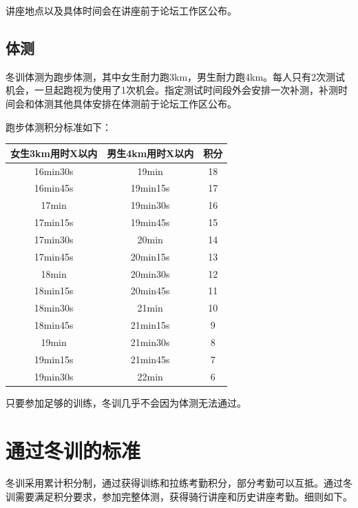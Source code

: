 \documentclass[UTF8]{ctexart}
\begin{document}
讲座地点以及具体时间会在讲座前于论坛工作区公布。

\subsection{体测}

冬训体测为跑步体测，其中女生耐力跑3km，男生耐力跑4km。每人只有2次测试机会，一旦起跑视为使用了1次机会。指定测试时间段外会安排一次补测，补测时间会和体测其他具体安排在体测前于论坛工作区公布。

跑步体测积分标准如下：

\begin{table}[h]
    \centering
    \begin{tabular}{|c|c|c|}
    \hline
    女生3km用时X以内 & 男生4km用时X以内 & 积分 \\ \hline
    16min30s   & 19min      & 18 \\ \hline
    16min45s   & 19min15s   & 17 \\ \hline
    17min      & 19min30s   & 16 \\ \hline
    17min15s   & 19min45s   & 15 \\ \hline
    17min30s   & 20min      & 14 \\ \hline
    17min45s   & 20min15s   & 13 \\ \hline
    18min      & 20min30s   & 12 \\ \hline
    18min15s   & 20min45s   & 11 \\ \hline
    18min30s   & 21min      & 10 \\ \hline
    18min45s   & 21min15s   & 9  \\ \hline
    19min      & 21min30s   & 8  \\ \hline
    19min15s   & 21min45s   & 7  \\ \hline
    19min30s   & 22min      & 6  \\ \hline
    \end{tabular}\label{test}
    \end{table}

只要参加足够的训练，冬训几乎不会因为体测无法通过。 

\section{通过冬训的标准}

冬训采用累计积分制，通过获得训练和拉练考勤积分，部分考勤可以互抵。通过冬训需要满足积分要求，参加完整体测，获得骑行讲座和历史讲座考勤。细则如下。
\end{document}
